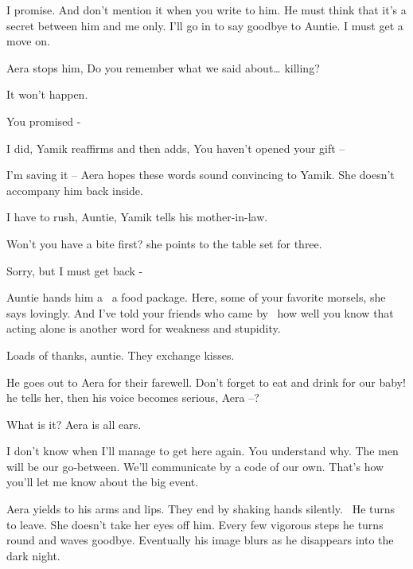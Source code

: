 \documentclass[letterpaper]{article}
\begin{document}
{\textquotedbl}I promise. And don't mention it when you write to him. He must think that it's a secret between him and
me only. I'll go in to say goodbye to Auntie. I must get a move on.{\textquotedbl} 

Aera stops him, {\textquotedbl}Do you remember what we said about{\dots} killing?{\textquotedbl} 

{\textquotedbl}It won't happen.{\textquotedbl} 

{\textquotedbl}You promised -{\textquotedbl} 

{\textquotedbl}I did,{\textquotedbl} Yamik reaffirms and then adds, {\textquotedbl}You haven't opened your gift
--{\textquotedbl}

{\textquotedbl}I'm saving it --{\textquotedbl} Aera hopes these words sound convincing to Yamik. She doesn't accompany
him back inside.

{\textquotedbl}I have to rush, Auntie,{\textquotedbl} Yamik tells his mother-in-law. 

{\textquotedbl}Won't you have a bite first?{\textquotedbl} she points to the table set for three. 

{\textquotedbl}Sorry, but I must get back -{\textquotedbl} 

Auntie hands him a \ a food package. {\textquotedbl}Here, some of your favorite morsels,{\textquotedbl} she says
lovingly. {\textquotedbl}And I've told your friends who came by \ how well you know that acting alone is another word
for weakness and stupidity.{\textquotedbl} 

{\textquotedbl}Loads of thanks, auntie.{\textquotedbl} They exchange kisses. 

He goes out{ }to Aera for their farewell. {\textquotedbl}Don't forget to eat and drink for our
baby!{\textquotedbl} he tells her, then his voice becomes serious, {\textquotedbl}Aera --?{\textquotedbl}

{\textquotedbl}What is it?{\textquotedbl} Aera is all ears.

{\textquotedbl}I don't know when I'll manage to get here again. You understand why. The men will be our go-between.
We'll communicate by a code of our own. That's how you'll let me know about the big event.{\textquotedbl} 

Aera yields to his arms and lips. They end by shaking hands silently. ~He turns to leave. She doesn't take her eyes off
him. Every few vigorous steps he turns round and waves goodbye. Eventually his image blurs as he disappears into the
dark night. 
\end{document}
